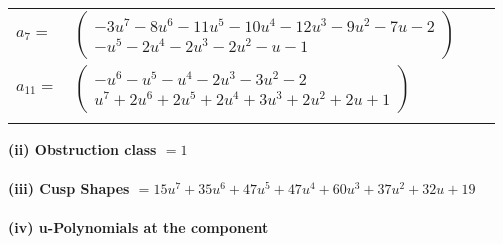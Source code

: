 \documentclass[1p]{elsarticle_modified}
\theoremstyle{definition}
\begin{document}
\begin{tabular}{m{7pt} m{180pt} m{7pt} m{180pt} }
\flushright $a_{7}=$&$\begin{pmatrix}-3 u^7-8 u^6-11 u^5-10 u^4-12 u^3-9 u^2-7 u-2\\- u^5-2 u^4-2 u^3-2 u^2- u-1\end{pmatrix}$ \\
\flushright $a_{11}=$&$\begin{pmatrix}- u^6- u^5- u^4-2 u^3-3 u^2-2\\u^7+2 u^6+2 u^5+2 u^4+3 u^3+2 u^2+2 u+1\end{pmatrix}$\\&\end{tabular}
\flushleft \textbf{(ii) Obstruction class $= 1$}\\~\\
\flushleft \textbf{(iii) Cusp Shapes $= 15 u^7+35 u^6+47 u^5+47 u^4+60 u^3+37 u^2+32 u+19$}\\~\\
\newpage\renewcommand{\arraystretch}{1}
\flushleft \textbf{(iv) u-Polynomials at the component}\newline \\
\end{document}
